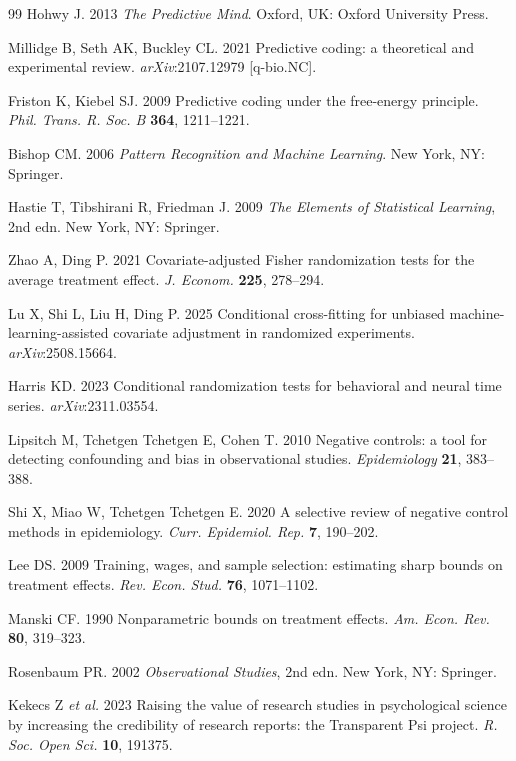 \documentclass[11pt,a4paper]{article}
\theoremstyle{definition}
\begin{document}
\begin{thebibliography}{99}
Hohwy J. 2013 \textit{The Predictive Mind}. Oxford, UK: Oxford University Press.

Millidge B, Seth AK, Buckley CL. 2021 Predictive coding: a theoretical and
experimental review. \textit{arXiv}:2107.12979 [q-bio.NC].

Friston K, Kiebel SJ. 2009 Predictive coding under the free-energy principle.
\textit{Phil. Trans. R. Soc. B} \textbf{364}, 1211--1221.

Bishop CM. 2006 \textit{Pattern Recognition and Machine Learning}. New York, NY:
Springer.

Hastie T, Tibshirani R, Friedman J. 2009 \textit{The Elements of Statistical
Learning}, 2nd edn. New York, NY: Springer.

Zhao A, Ding P. 2021 Covariate-adjusted Fisher randomization tests for the
average treatment effect. \textit{J. Econom.} \textbf{225}, 278--294.

Lu X, Shi L, Liu H, Ding P. 2025 Conditional cross-fitting for unbiased
machine-learning-assisted covariate adjustment in randomized experiments.
\textit{arXiv}:2508.15664.

Harris KD. 2023 Conditional randomization tests for behavioral and neural time
series. \textit{arXiv}:2311.03554.

Lipsitch M, Tchetgen Tchetgen E, Cohen T. 2010 Negative controls: a tool for
detecting confounding and bias in observational studies.
\textit{Epidemiology} \textbf{21}, 383--388.

Shi X, Miao W, Tchetgen Tchetgen E. 2020 A selective review of negative control
methods in epidemiology. \textit{Curr. Epidemiol. Rep.} \textbf{7}, 190--202.

Lee DS. 2009 Training, wages, and sample selection: estimating sharp bounds on
treatment effects. \textit{Rev. Econ. Stud.} \textbf{76}, 1071--1102.

Manski CF. 1990 Nonparametric bounds on treatment effects.
\textit{Am. Econ. Rev.} \textbf{80}, 319--323.

Rosenbaum PR. 2002 \textit{Observational Studies}, 2nd edn. New York, NY:
Springer.

Kekecs Z \textit{et al.} 2023 Raising the value of research studies in
psychological science by increasing the credibility of research reports: the
Transparent Psi project. \textit{R. Soc. Open Sci.} \textbf{10}, 191375.


\end{thebibliography}
\end{document}
